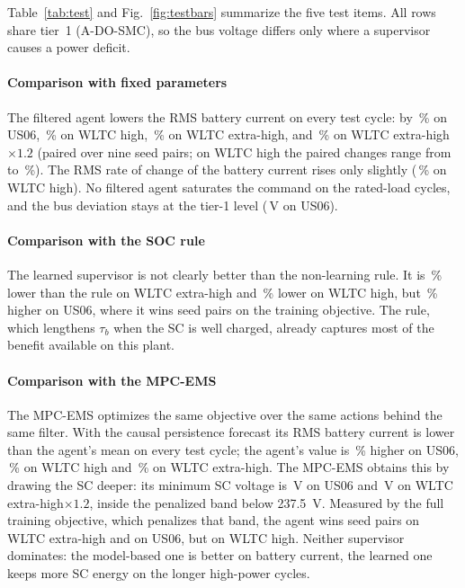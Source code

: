 Table~\ref{tab:test} and Fig.~\ref{fig:testbars} summarize the five test items. All rows share tier~1 (A-DO-SMC), so the bus voltage differs only where a supervisor causes a power deficit.

\paragraph{Comparison with fixed parameters}
The filtered agent lowers the RMS battery current on every test cycle: by \,\% on US06, \,\% on WLTC high, \,\% on WLTC extra-high, and \,\% on WLTC extra-high$\times1.2$ (paired over nine seed pairs; on WLTC high the paired changes range from  to \,\%). The RMS rate of change of the battery current rises only slightly (\,\% on WLTC high). No filtered agent saturates the command on the rated-load cycles, and the bus deviation stays at the tier-1 level (\,V on US06).

\paragraph{Comparison with the SOC rule}
The learned supervisor is not clearly better than the non-learning rule. It is \,\% lower than the rule on WLTC extra-high and \,\% lower on WLTC high, but \,\% higher on US06, where it wins  seed pairs on the training objective. The rule, which lengthens $\tau_b$ when the SC is well charged, already captures most of the benefit available on this plant.

\paragraph{Comparison with the MPC-EMS}
The MPC-EMS optimizes the same objective over the same actions behind the same filter. With the causal persistence forecast its RMS battery current is lower than the agent's mean on every test cycle; the agent's value is \,\% higher on US06, \,\% on WLTC high and \,\% on WLTC extra-high. The MPC-EMS obtains this by drawing the SC deeper: its minimum SC voltage is \,V on US06 and \,V on WLTC extra-high$\times1.2$, inside the penalized band below \SI{237.5}{V}. Measured by the full training objective, which penalizes that band, the agent wins  seed pairs on WLTC extra-high and  on US06, but  on WLTC high. Neither supervisor dominates: the model-based one is better on battery current, the learned one keeps more SC energy on the longer high-power cycles.

